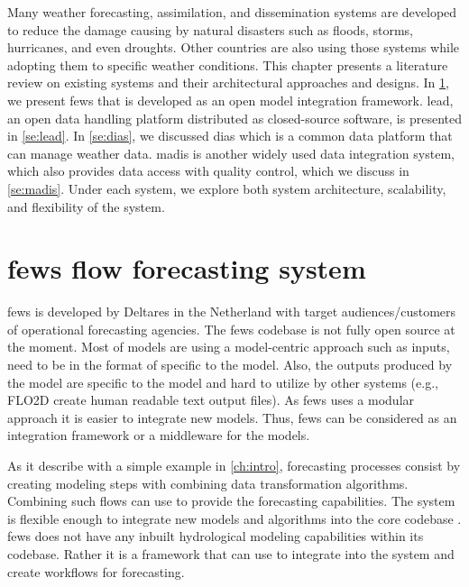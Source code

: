 Many weather forecasting, assimilation, and dissemination systems are developed to reduce the damage causing by natural disasters such as floods, storms, hurricanes, and even droughts. %
Other countries are also using those systems while adopting them %
to specific weather conditions.%
This chapter presents a literature review on existing systems and their architectural approaches and designs. In \cref{se:fews}, we present \acrfull{fews} that is developed as an open model integration framework. \acrfull{lead}, an open data handling platform distributed as closed-source software, is presented in \cref{se:lead}. %
In \cref{se:dias}, we discussed \acrfull{dias} which is a common data platform that can manage weather data. \acrfull{madis} is another widely used data integration system, which also provides data access with quality control, which we discuss in \cref{se:madis}.
Under each system, we explore both system architecture, scalability, and flexibility of the system.



\section{\acrshort{fews} flow forecasting system}
\label{se:fews}

\acrshort{fews} \cite{Werner2013TheSystem} is developed by Deltares in the Netherland with target audiences/customers of operational forecasting agencies. The \acrshort{fews} codebase is not fully open source at the moment.
Most of models are using a model-centric approach such as inputs, need to be in the format of specific to the model. Also, the outputs produced by the model are specific to the model and hard to utilize by other systems (e.g., FLO2D create human readable text output files). As \acrshort{fews} uses a modular approach it is easier to integrate new models. 
Thus, \acrshort{fews} can be considered as an integration framework or a middleware for the models.

As it describe with a simple example in \cref{ch:intro}, forecasting processes consist by creating modeling steps with combining data transformation algorithms. Combining such flows can use to provide the forecasting capabilities. The system is flexible enough to integrate new models and algorithms into the core codebase \cite{Werner2013TheSystem}. \acrshort{fews} does not have any inbuilt hydrological modeling capabilities within its codebase. Rather it is a framework that can use to integrate into the system and create workflows for forecasting.

